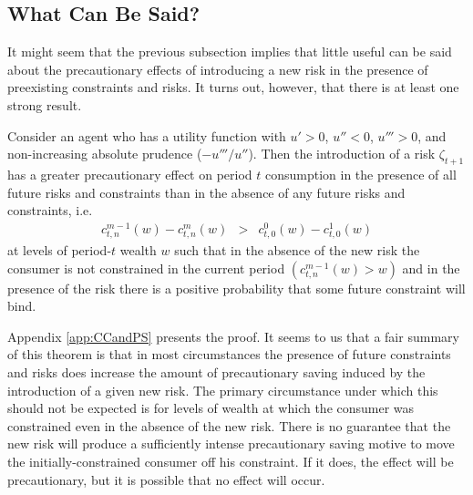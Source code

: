 \subsection{What Can Be Said?}\label{subsubsec:WhatCanBeSaid}



It might seem that the previous subsection implies that little useful can be said about the precautionary effects of introducing a new risk in the presence of preexisting constraints and risks. It turns out, however, that there is at least one strong result.

\begin{theorem}\label{thm:CCandPS}
	Consider an agent who has a utility function with $u'> 0$, $u''< 0$, $u''' > 0$, and non-increasing absolute prudence ($-u'''/u''$). Then the introduction of a risk $\zeta_{t+1}$ has a greater precautionary effect on period $t$ consumption in the presence of all future risks and constraints than in the absence of any future risks and constraints, i.e.
	\begin{eqnarray}
	c_{t,n}^{m-1}(w) - c_{t,n}^{m}(w) & > & c_{t,0}^0(w)-c^{1}_{t,0}(w) \label{eq:whatcanbesaid}
	\end{eqnarray}
    at levels of period-$t$ wealth $w$ such that in the absence of the new risk the consumer is not constrained in the current period $(c_{t,n}^{m-1}(w) > w)$ and in the presence of the risk there is a positive probability that some future constraint will bind.
\end{theorem}

Appendix \ref{app:CCandPS} presents the proof. It seems to us that a fair summary of this theorem is that in most circumstances the presence of future constraints and risks does increase the amount of precautionary saving induced by the introduction of a given new risk.  The primary circumstance under which this should not be expected is for levels of wealth at which the consumer was constrained even in the absence of the new risk. There is no guarantee that the new risk will produce a sufficiently intense precautionary saving motive to move the initially-constrained consumer off his constraint.  If it does, the effect will be precautionary, but it is possible that no effect will occur.

